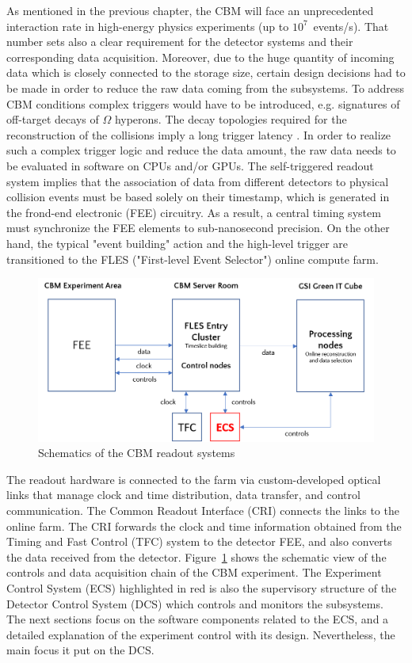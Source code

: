 
As mentioned in the previous chapter, the \gls{CBM} will face an unprecedented interaction rate in high-energy physics experiments (up to $10^{7}$~events/s). That number sets also a clear requirement for the detector systems and their corresponding data acquisition. Moreover, due to the huge quantity of incoming data which is closely connected to the storage size, certain design decisions had to be made in order to reduce the raw data coming from the subsystems. To address \gls{CBM} conditions complex triggers would have to be introduced, e.g. signatures of off-target decays of $\Omega$ hyperons. The decay topologies required for the reconstruction of the collisions imply a long trigger latency \cite{Friese_2017}. In order to realize such a complex trigger logic and reduce the data amount, the raw data needs to be evaluated in software on \glspl{CPU} and/or \glspl{GPU}. The self-triggered readout system implies that the association of data from different detectors to physical collision events must be based solely on their timestamp, which is generated in the frond-end electronic (\gls{FEE}) circuitry. As a result, a central timing system must synchronize the \gls{FEE} elements to sub-nanosecond precision. On the other hand, the typical "event building" action and the high-level trigger are transitioned to the \gls{FLES} ("First-level Event Selector") online compute farm. 

\begin{figure}[!h]
\centering
\includegraphics[width=0.8\columnwidth]{Chapter3/Controls/images/online.png}
\caption{Schematics of the CBM readout systems}
\label{fig_controls}
\end{figure}

The readout hardware is connected to the farm via custom-developed optical links that manage clock and time distribution, data transfer, and control communication. The Common Readout Interface (\gls{CRI}) connects the links to the online farm. The CRI forwards the clock and time information obtained from the Timing and Fast Control (\gls{TFC}) system to the detector \gls{FEE}, and also converts the data received from the detector. Figure~\ref{fig_controls} shows the schematic view of the controls and data acquisition chain of the \gls{CBM} experiment. The Experiment Control System (\gls{ECS}) highlighted in red is also the supervisory structure of the Detector Control System (\gls{DCS}) which controls and monitors the subsystems. The next sections focus on the software components related to the \gls{ECS}, and a detailed explanation of the experiment control with its design. Nevertheless, the main focus it put on the \gls{DCS}.
